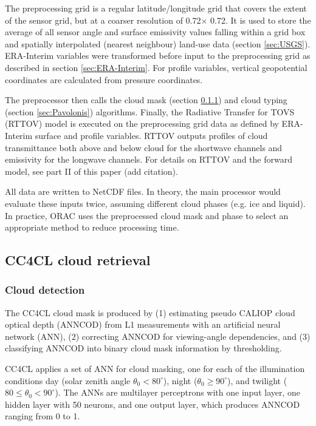 The preprocessing grid is a regular latitude/longitude grid that covers the extent of the sensor grid, but at a coarser resolution of 0.72\textdegree $\times$ 0.72\textdegree. It is used to store the average of all sensor angle and surface emissivity values falling within a grid box and spatially interpolated (nearest neighbour) land-use data (section \ref{sec:USGS}). ERA-Interim variables were transformed before input to the preprocessing grid as described in section \ref{sec:ERA-Interim}. For profile variables, vertical geopotential coordinates are calculated from pressure coordinates.

The preprocessor then calls the cloud mask (section \ref{sec:CloudMask}) and cloud typing (section \ref{sec:Pavolonis}) algorithms. Finally, the Radiative Transfer for TOVS (RTTOV) model is executed on the preprocessing grid data as defined by ERA-Interim surface and profile variables. RTTOV outputs profiles of cloud transmittance both above and below cloud for the shortwave channels and emissivity for the longwave channels. For details on RTTOV and the forward model, see part II of this paper (add citation).

All data are written to NetCDF files. In theory, the main processor would evaluate these inputs twice, assuming different cloud phases (e.g. ice and liquid). In practice, ORAC uses the preprocessed cloud mask and phase to select an appropriate method to reduce processing time.

\subsection{CC4CL cloud retrieval}

\subsubsection{Cloud detection}\label{sec:CloudMask}

The CC4CL cloud mask is produced by (1) estimating pseudo CALIOP cloud optical depth (ANNCOD) from L1 measurements with an artificial neural network (ANN), (2) correcting ANNCOD for viewing-angle dependencies, and (3) classifying ANNCOD into binary cloud mask information by thresholding.

CC4CL applies a set of ANN for cloud masking, one for each of the illumination conditions day (solar zenith angle $\theta_{0} < 80^{\circ}$), night ($\theta_{0} \ge 90^{\circ}$), and twilight ($80 \le \theta_{0} < 90^{\circ}$). The ANNs are multilayer perceptrons with one input layer, one hidden layer with 50 neurons, and one output layer, which produces ANNCOD ranging from 0 to 1.

